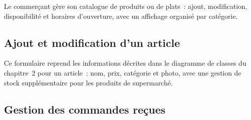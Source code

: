 \documentclass[12pt,fleqn,a4paper]{report}
\begin{document}
\begin{justify}

Le commerçant gère son catalogue de produits ou de plats~: ajout, modification, disponibilité et horaires d'ouverture, avec un affichage organisé par catégorie.

\subsection{Ajout et modification d'un article}


Ce formulaire reprend les informations décrites dans le diagramme de classes du chapitre~2 pour un article~: nom, prix, catégorie et photo, avec une gestion de stock supplémentaire pour les produits de supermarché.

\subsection{Gestion des commandes reçues}




\end{justify}
\end{document}
